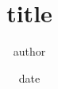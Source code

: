 \documentclass[uplatex, dvipdfmx]{jsarticle}
\begin{document}
\title{\huge title}
\author{author}
\date{date}
\maketitle
\end{document}
